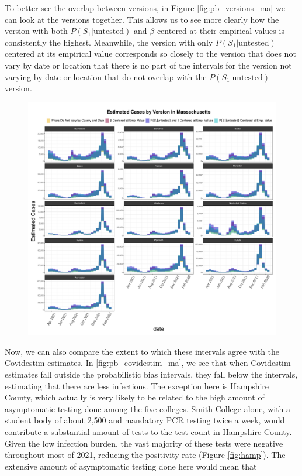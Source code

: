 \documentclass[12pt,twoside]{smiththesis}
\begin{document}
To better see the overlap between versions, in Figure \ref{fig:pb_versions_ma} we can look at the versions together. This allows us to see more clearly how the version with both \(P(S_1|\text{untested})\) and \(\beta\) centered at their empirical values is consistently the highest. Meanwhile, the version with only \(P(S_1|\text{untested})\) centered at its empirical value corresponds so closely to the version that does not vary by date or location that there is no part of the intervals for the version not varying by date or location that do not overlap with the \(P(S_1|\text{untested})\) version.
\begin{figure}
\includegraphics[width=0.95\linewidth]{figure/ma_pb_compare_versions} \caption{\label{fig:pb_versions_ma}}\label{fig:unnamed-chunk-15}
\end{figure}
Now, we can also compare the extent to which these intervals agree with the Covidestim estimates. In \ref{fig:pb_covidestim_ma}, we see that when Covidestim estimates fall outside the probabilistic bias intervals, they fall below the intervals, estimating that there are less infections. The exception here is Hampshire County, which actually is very likely to be related to the high amount of asymptomatic testing done among the five colleges. Smith College alone, with a student body of about 2,500 and mandatory PCR testing twice a week, would contribute a substantial amount of tests to the test count in Hampshire County. Given the low infection burden, the vast majority of these tests were negative throughout most of 2021, reducing the positivity rate (Figure \ref{fig:hamp}). The extensive amount of asymptomatic testing done here would mean that
\end{document}
